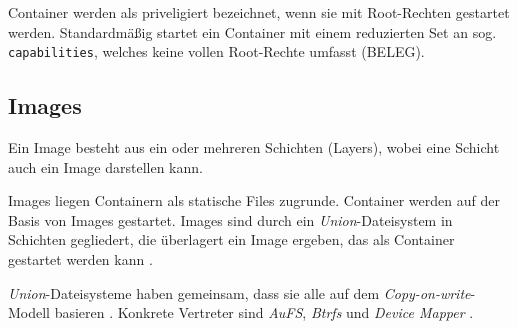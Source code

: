 \documentclass[../main.tex]{subfiles}
\begin{document}
      Container werden als priveligiert bezeichnet, wenn sie mit Root-Rechten gestartet werden. Standardmäßig startet ein Container mit einem reduzierten Set an sog. \texttt{capabilities}, welches keine vollen Root-Rechte umfasst (BELEG).





    \subsection{Images}
    \label{dockerImages}
      Ein Image besteht aus ein oder mehreren Schichten (Layers), wobei eine Schicht auch ein Image darstellen kann.

      Images liegen Containern als statische Files zugrunde. Container werden auf der Basis von Images gestartet. Images sind durch ein \emph{Union}-Dateisystem in Schichten gegliedert, die überlagert ein Image ergeben, das als Container gestartet werden kann \cite[S.11]{dockerBook}.

      \emph{Union}-Dateisysteme haben gemeinsam, dass sie alle auf dem \emph{Copy-on-write}-Modell basieren \cite[S.8]{dockerBook}. Konkrete Vertreter sind \emph{AuFS}, \emph{Btrfs} und \emph{Device Mapper} \cite[S.3]{dockerIntroIEEE}.
\end{document}
